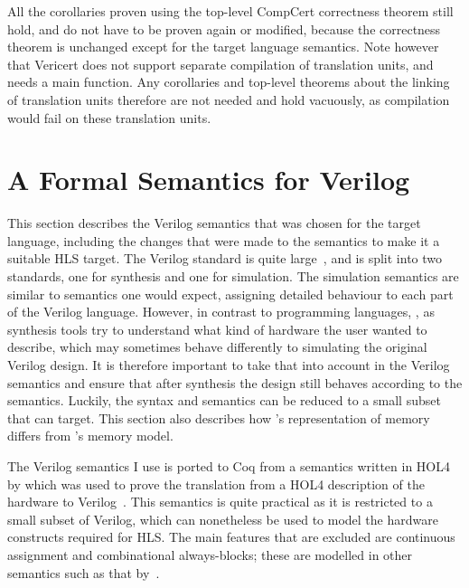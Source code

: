 All the corollaries proven using the top-level CompCert correctness theorem
still hold, and do not have to be proven again or modified, because the
correctness theorem is unchanged except for the target language semantics.  Note
however that Vericert does not support separate compilation of translation
units, and needs a main function.  Any corollaries and top-level theorems about
the linking of translation units therefore are not needed and hold vacuously, as
compilation would fail on these translation units.

\section{A Formal Semantics for Verilog}\label{sec:verilog}

This section describes the Verilog semantics that was chosen for the target
language, including the changes that were made to the semantics to make it a
suitable HLS target.  The Verilog standard is quite
large~\cite{06_ieee_stand_veril_hardw_descr_languag,
  05_ieee_stand_veril_regis_trans_level_synth}, and is split into two standards,
one for synthesis and one for simulation.  The simulation semantics are similar
to semantics one would expect, assigning detailed behaviour to each part of the
Verilog language.  However, in contrast to programming languages,
, as synthesis tools try to
understand what kind of hardware the user wanted to describe, which may
sometimes behave differently to simulating the original Verilog design.  It is
therefore important to take that into account in the Verilog semantics and
ensure that after synthesis the design still behaves according to the semantics.
Luckily, the syntax and semantics can be reduced to a small subset that
\vericert{} can target.  This section also describes how \vericert{}'s
representation of memory differs from \compcert{}'s memory model.

The Verilog semantics I use is ported to Coq from a semantics written in HOL4 by
\textcite{lööw19_proof_trans_veril_devel_hol} which was used to prove the
translation from a HOL4 description of the hardware to
Verilog~\cite{lööw19_verif_compil_verif_proces}.  This semantics is quite
practical as it is restricted to a small subset of Verilog, which can
nonetheless be used to model the hardware constructs required for HLS.  The main
features that are excluded are continuous assignment and combinational
always-blocks; these are modelled in other semantics such as that
by~\textcite{meredith10_veril}.

